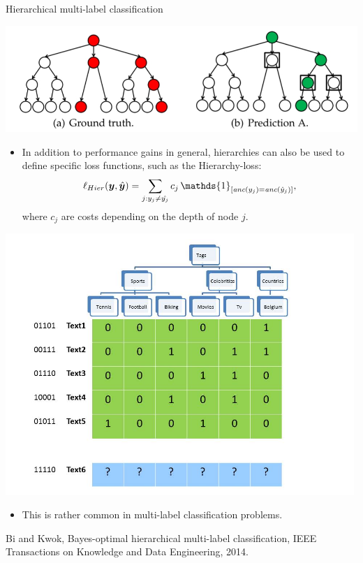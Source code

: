 \begin{frame}{Hierarchical multi-label classification}
	\small
	\vspace{-0.2cm}
	\begin{center}
		\includegraphics[width=\textwidth]{figure/hloss}
	\end{center}
	
	\vspace{-0.2cm}
	\begin{minipage}{0.75\textwidth}   
	\begin{itemize}
%		
		\item %
		In addition to performance gains in general, hierarchies can also be used to define specific loss functions, such as the Hierarchy-loss: 
		$$\ell_{Hier}(\yv,\hat{\yv}) = \sum_{j: y_j \neq \hat{y_j}} c_j \, \mathds{1}_{ [\textit{anc}(y_j) = \textit{anc}(\hat{y}_j)]  },$$
		where $c_j$ are costs depending on the depth of node $j.$
%		
	\end{itemize}
\end{minipage}
\begin{minipage}{0.2\textwidth}    
	\begin{center}
		\includegraphics[width=0.99\textwidth,trim = 0 0 100 20,clip]{figure/Slide5}
	\end{center}
\end{minipage}
\begin{itemize}
%	
	\item This is rather common in multi-label classification problems.
%	
\end{itemize}

	{\tiny Bi and Kwok, Bayes-optimal hierarchical multi-label classification, IEEE Transactions on Knowledge and Data Engineering, 2014.}
%
\end{frame}




